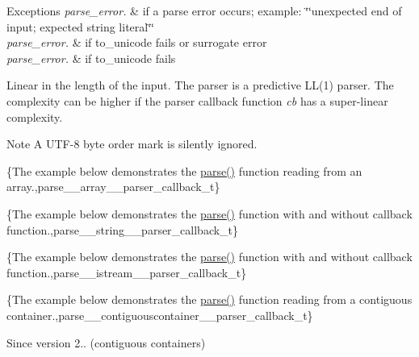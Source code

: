 \begin{DoxyExceptions}{Exceptions}
{\em parse\+\_\+error.} & if a parse error occurs; example\+: {\ttfamily \char`\"{}\char`\"{}unexpected end of input; expected string literal\char`\"{}\char`\"{}} \\
\hline
{\em parse\+\_\+error.} & if to\+\_\+unicode fails or surrogate error \\
\hline
{\em parse\+\_\+error.} & if to\+\_\+unicode fails\\
\hline
\end{DoxyExceptions}
Linear in the length of the input. The parser is a predictive L\+L(1) parser. The complexity can be higher if the parser callback function {\itshape cb} has a super-\/linear complexity.

\begin{DoxyNote}{Note}
A U\+T\+F-\/8 byte order mark is silently ignored.
\end{DoxyNote}
\{The example below demonstrates the {\ttfamily \hyperlink{classnlohmann_1_1basic__json_a265a473e939184aa42655c9ccdf34e58}{parse()}} function reading from an array.,parse\+\_\+\+\_\+array\+\_\+\+\_\+parser\+\_\+callback\+\_\+t\}

\{The example below demonstrates the {\ttfamily \hyperlink{classnlohmann_1_1basic__json_a265a473e939184aa42655c9ccdf34e58}{parse()}} function with and without callback function.,parse\+\_\+\+\_\+string\+\_\+\+\_\+parser\+\_\+callback\+\_\+t\}

\{The example below demonstrates the {\ttfamily \hyperlink{classnlohmann_1_1basic__json_a265a473e939184aa42655c9ccdf34e58}{parse()}} function with and without callback function.,parse\+\_\+\+\_\+istream\+\_\+\+\_\+parser\+\_\+callback\+\_\+t\}

\{The example below demonstrates the {\ttfamily \hyperlink{classnlohmann_1_1basic__json_a265a473e939184aa42655c9ccdf34e58}{parse()}} function reading from a contiguous container.,parse\+\_\+\+\_\+contiguouscontainer\+\_\+\+\_\+parser\+\_\+callback\+\_\+t\}

\begin{DoxySince}{Since}
version 2.. (contiguous containers) 
\end{DoxySince}
